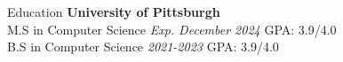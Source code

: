 \begin{rSection}{Education}
    {\bf University of Pittsburgh}\\
    M.S in Computer Science
    \hfill
    {\em Exp. December 2024}
    GPA: 3.9/4.0
    \\
    B.S in Computer Science
    \hfill
    {\em 2021-2023}
    GPA: 3.9/4.0
    
\end{rSection}